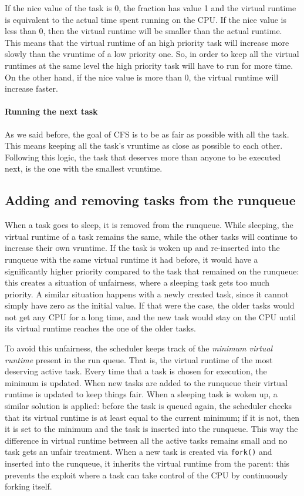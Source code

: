 If the nice value of the task is 0, the fraction has value 1 and the virtual runtime is equivalent to the actual time spent running on the CPU. If the nice value is less than 0, then the virtual runtime will be smaller than the actual runtime. This means that the virtual runtime of an high priority task will increase more slowly than the vruntime of a low priority one. So, in order to keep all the virtual runtimes at the same level the high priority task will have to run for more time. On the other hand, if the nice value is more than 0, the virtual runtime will increase faster.

\paragraph{Running the next task}

As we said before, the goal of CFS is to be as fair as possible with all the task. This means keeping all the task's vruntime as close as possible to each other. Following this logic, the task that deserves more than anyone to be executed next, is the one with the smallest vruntime.

\subsection{Adding and removing tasks from the runqueue}
When a task goes to sleep, it is removed from the runqueue. While sleeping, the virtual runtime of a task remains the same, while the other tasks will continue to increase their own vruntime. If the task is woken up and re-inserted into the runqueue with the same virtual runtime it had before, it would have a significantly higher priority compared to the task that remained on the runqueue: this creates a situation of unfairness, where a sleeping task gets too much priority.
A similar situation happens with a newly created task, since it cannot simply have zero as the initial value. If that were the case, the older tasks would not get any CPU for a long time, and the new task would stay on the CPU until its virtual runtime reaches the one of the older tasks.

To avoid this unfairness, the scheduler keeps track of the \textit{minimum virtual runtime} present in the run queue. That is, the virtual runtime of the most deserving active task. Every time that a task is chosen for execution, the minimum is updated. When new tasks are added to the runqueue their virtual runtime is updated to keep things fair. When a sleeping task is woken up, a similar solution is applied: before the task is queued again, the scheduler checks that its virtual runtime is at least equal to the current minimum; if it is not, then it is set to the minimum and the task is inserted into the runqueue. This way the difference in virtual runtime between all the active tasks remains small and no task gets an unfair treatment. When a new task is created via \verb|fork()| and inserted into the runqueue, it inherits the virtual runtime from the parent: this prevents the exploit where a task can take control of the CPU by continuously forking itself.

